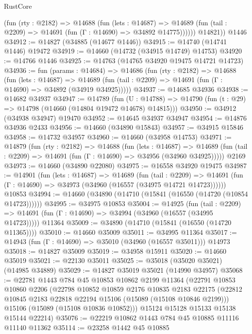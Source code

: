 \begin{lexlean}{RustCore}
\begin{coremodule}
            (fun (rty : @2182) =>
            @14688
              (fun (lets : @14687) =>
              @14689 (fun (tail : @2209) => @14691 (fun (Γ : @14690) => @34892 @14775))))))
        @14821))
    @1446
@34912 := @14827 (@34885 (@14677 @1446))
@34915 := @14740 (@14741 @1446) @19472
@34919 := @14660 (@14732 (@34915 @14749) @14753)
@34920 := @14766 @1446
@34925 := @14763 (@14765 @34920 @19475 @14721 @14723)
@34936 := fun (params : @14684) =>
  @14686
    (fun (rty : @2182) =>
    @14688
      (fun (lets : @14687) =>
      @14689 (fun (tail : @2209) => @14691 (fun (Γ : @14690) => @34892 (@34919 @34925)))))
@34937 := @14685 @34936
@34938 := @14682 @34937
@34947 := @14789
    (fun (U : @14788) => @14790 (fun (t : @29) => @14798 (@14660 (@14804 @19472 @14678) @14815)))
@34950 := @34912 (@34938 @34947) @19470
@34952 := @14645 @34937 @34947
@34954 := @14876 @34936 @2433
@34956 := @14660 (@34890 @15843)
@34957 := @34915 @15846
@34958 := @14732 @34957
@34960 := @14660 (@34958 @14753)
@34971 := @14879
    (fun (rty : @2182) =>
    @14688
      (fun (lets : @14687) =>
      @14689 (fun (tail : @2209) => @14691 (fun (Γ : @14690) => @34956 (@34960 @34925)))))
    @2169
@34973 := @14660 (@34890 @22080)
@34975 := @16558 @34920 @19475
@34987 := @14901
    (fun (lets : @14687) =>
    @14689
      (fun (tail : @2209) =>
      @14691 (fun (Γ : @14690) => @34973 (@34960 (@16557 (@34975 @14721 @14723))))))
    @10853
@34994 := @14660 (@34890 (@14710 (@15841 (@16550 (@14720 (@10854 @14723))))))
@34995 := @34975 @10853
@35004 := @14925
    (fun (tail : @2209) => @14691 (fun (Γ : @14690) => @34994 (@34960 (@16557 (@34995 @14723)))))
    @11364
@35009 := @34890 (@14710 (@15841 (@16550 (@14720 @11365))))
@35010 := @14660 @35009
@35011 := @34995 @11364
@35017 := @14943 (fun (Γ : @14690) => @35010 (@34960 (@16557 @35011))) @14973
@35018 := @14827 @35009
@35019 := @34958 @15911
@35020 := @14660 @35019
@35021 := @22130 @35011
@35025 := @35018 (@35020 @35021) (@14985 @34889)
@35029 := @14827 @35019 @35021 (@14990 @34957)
@35068 := @22781
    @1443
    @784
    @45
    @10853
    @10862
    @2199
    @11364
    (@22791
      @10853
      @10860
      @2206
      (@22798
        @10852
        @10859
        @2176
        @10835
        @2183
        @22175
        (@22812 @10845 @2183 @22818 @22194 @15106 (@15089 (@15108 @10846 @2199)))
        @15106
        (@15089 (@15108 @10836 @10852)))
      @15124
      @15128
      @15133
      @15138
      @15144
      @22214)
@35076 := @22219 @10862 @1443 @784 @45 @10885 @11116 @11140 @11362
@35114 := @23258
    @1442
    @45
    @10885

\end{coremodule}
\end{lexlean}
